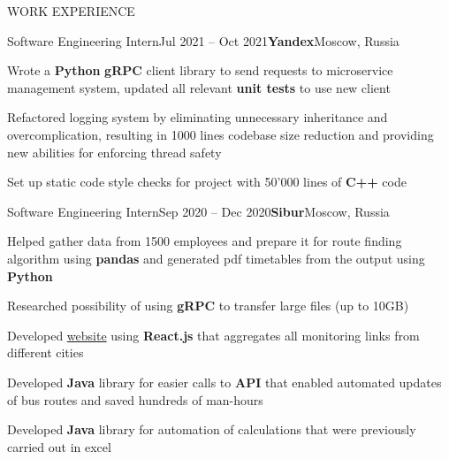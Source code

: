 \documentclass{./resume} %
\begin{document}
\begin{rSection}{WORK EXPERIENCE}
    \begin{rSubsection}{Software Engineering Intern}{Jul 2021 -- Oct 2021}{\textbf{Yandex}}{Moscow, Russia}
        \item Wrote a \textbf{Python} \textbf{gRPC} client library to send
        requests to microservice management system,
        updated all relevant \textbf{unit tests} to use new client
        \item Refactored logging system by eliminating unnecessary inheritance
        and overcomplication, resulting in 1000 lines codebase size reduction
        and providing new abilities for enforcing thread safety
        \item Set up static code style checks for project with 50'000 lines of
        \textbf{C++} code
    \end{rSubsection}

    \begin{rSubsection}{Software Engineering Intern}{Sep 2020 -- Dec 2020}{\textbf{Sibur}}{Moscow, Russia}
        \item Helped gather data from 1500 employees and prepare it for route
        finding algorithm using \textbf{pandas} and generated pdf timetables
        from the output using \textbf{Python}
        \item Researched possibility of using \textbf{gRPC} to transfer large
        files (up to 10GB)
        \item Developed \href{https://www.sibur.ru/bus/}{website} using
        \textbf{React.js} that aggregates all monitoring links from
        different cities
        \item Developed \textbf{Java} library for easier calls
        to \textbf{API} that enabled automated updates of bus routes and
        saved hundreds of man-hours
        \item Developed \textbf{Java} library for automation
        of calculations that were previously carried out in excel
    \end{rSubsection}
\end{rSection}

\end{document}

